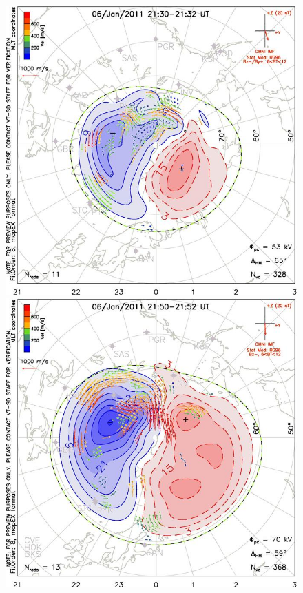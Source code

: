 \documentclass[norsk,a4paper,12pt]{article}
\begin{document}
\begin{multicols}{2}
\begin{figure}[H]
	\includegraphics[scale = 0.9]{Figures/Superdarn/superdarn_21_30.jpg}
	\includegraphics[scale = 0.9]{Figures/Superdarn/superdarn_21_52.jpg}

\end{figure}
\end{multicols}
\end{document}

